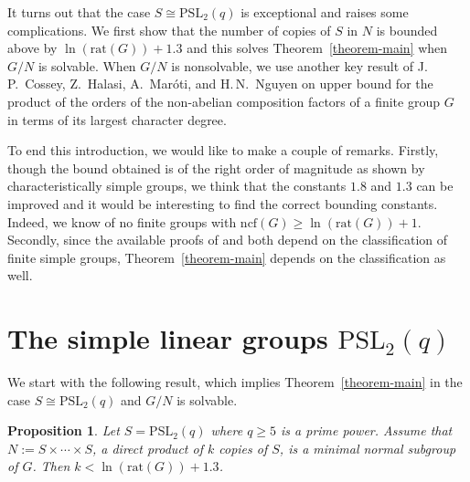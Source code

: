 \documentclass[12pt]{amsart}
\newtheorem{proposition}[theorem]{Proposition}
\theoremstyle{definition}
\theoremstyle{remark}
\begin{document}
It turns out that the case $S\cong{{\mathrm {PSL}}}_2(q)$ is exceptional and
raises some complications. We first show that the number of copies
of $S$ in $N$ is bounded above by $\ln({{\mathrm {rat}}}(G))+1.3$ and this solves
Theorem~\ref{theorem-main} when $G/N$ is solvable. When $G/N$ is
nonsolvable, we use another key result of J.\,P.~Cossey, Z.~Halasi,
A.~Mar\'{o}ti, and H.\,N.~Nguyen
\cite[Theorem~6]{Cossey-Halasi-Maroti-Nguyen} on upper bound for the
product of the orders of the non-abelian composition factors of a
finite group $G$ in terms of its largest character degree.

To end this introduction, we would like to make a couple of remarks.
Firstly, though the bound obtained is of the right order of
magnitude as shown by characteristically simple groups, we think
that the constants $1.8$ and $1.3$ can be improved and it would be
interesting to find the correct bounding constants. Indeed, we know
of no finite groups with ${{\mathrm {ncf}}}(G)\geq \ln({{\mathrm {rat}}}(G))+1$. Secondly,
since the available proofs of \cite[Theorem~1]{Cossey-Nguyen} and
\cite[Theorem~6]{Cossey-Halasi-Maroti-Nguyen} both depend on the
classification of finite simple groups, Theorem~\ref{theorem-main}
depends on the classification as well.

\section{The simple linear groups ${{\mathrm {PSL}}}_2(q)$}

We start with the following result, which implies
Theorem~\ref{theorem-main} in the case $S\cong {{\mathrm {PSL}}}_2(q)$ and $G/N$
is solvable.

\begin{proposition}\label{proposition-main} Let $S={{\mathrm {PSL}}}_2(q)$ where $q\geq 5$ is a prime power.
Assume that $N:=S\times\cdots\times S$, a direct product of $k$
copies of $S$, is a minimal normal subgroup of $G$. Then
$k<\ln({{\mathrm {rat}}}(G))+1.3$.
\end{proposition}
\end{document}
